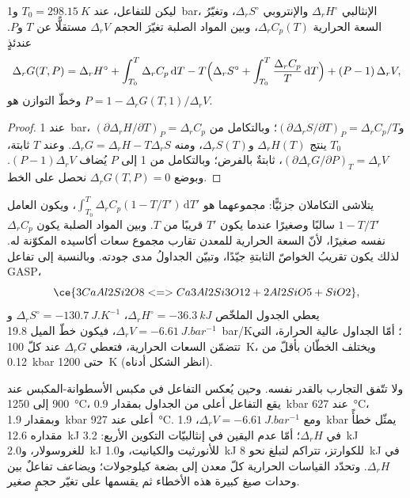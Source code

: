 \begin{theorem}\label{thm:b3:petrological-thermodynamics:dg}
ليكن للتفاعل، عند $T_0 = \qty{298.15}{K}$ و\qty{1}{bar}،
الإنثالبي $\Delta_rH^\circ$ والإنتروبي $\Delta_rS^\circ$، وتغيّرُ السعة الحرارية
$\Delta_rC_p(T)$، وبين المواد الصلبة تغيّرَ الحجم $\Delta_rV$
مستقلًّا عن $T$ و$P$. عندئذٍ
\[
  \Delta_rG(T, P) = \Delta_rH^\circ + \int_{T_0}^{T}\Delta_rC_p\,\mathrm dT
  - T\Bigl(\Delta_rS^\circ + \int_{T_0}^{T}\frac{\Delta_rC_p}{T}\,\mathrm dT\Bigr)
  + (P - 1)\,\Delta_rV ,
\]
وخطّ التوازن هو $P = 1 - \Delta_rG(T, 1)/\Delta_rV$.
\end{theorem}

\begin{proof}
عند \qty{1}{bar}، $(\partial\Delta_rH/\partial T)_P = \Delta_rC_p$
و$(\partial\Delta_rS/\partial T)_P = \Delta_rC_p/T$؛ وبالتكامل من $T_0$
ينتج $\Delta_rH(T)$ و$\Delta_rS(T)$، ومنه $\Delta_rG = \Delta_rH -
T\Delta_rS$. وعند $T$ ثابتة، $(\partial\Delta_rG/\partial P)_T = \Delta_rV$،
ثابتةٌ بالفرض؛ وبالتكامل من 1 إلى $P$ يُضاف $(P - 1)\Delta_rV$.
وبوضع $\Delta_rG(T, P) = 0$ نحصل على الخط.
\end{proof}

يتلاشى التكاملان جزئيًّا: مجموعهما هو $\int_{T_0}^T\Delta_rC_p(1 -
T/T')\,\mathrm dT'$، ويكون العامل $1 - T/T'$ سالبًا وصغيرًا
عندما يكون $T'$ قريبًا من $T$. وبين المواد الصلبة يكون $\Delta_rC_p$ نفسه صغيرًا،
لأنّ السعة الحرارية للمعدن تقارب مجموع سعات أكاسيده
المكوّنة له. لذلك يكون تقريبُ الخواصّ الثابتةِ جيّدًا، وتبيّن الجداولُ
مدى جودته. وبالنسبة إلى تفاعل GASP،
\[
  \ce{3 CaAl2Si2O8 <=> Ca3Al2Si3O12 + 2 Al2SiO5 + SiO2},
\]
يعطي الجدول الملخّص $\Delta_rH^\circ = \qty{-36.3}{kJ}$،
$\Delta_rS^\circ = \qty{-130.7}{J.K^{-1}}$ و$\Delta_rV =
\qty{-6.61}{J.bar^{-1}}$، فيكون خطّ الميل \qty{19.8}{bar/K}؛ أمّا
الجداول عالية الحرارة، التي تتضمّن السعات الحرارية، فتعطي
$\Delta_rG$ عند كلّ \qty{100}{K}، ويختلف الخطّان بأقلّ من
\qty{0.12}{kbar} حتى \qty{1200}{K} (انظر الشكل أدناه).

ولا تتّفق التجارب بالقدر نفسه. وحين يُعكس التفاعل في مكبس الأسطوانة-المكبس عند
900 إلى \qty{1250}{\celsius}، يقع التفاعل أعلى من الجداول بمقدار \qty{0.9}{kbar}
عند \qty{627}{\celsius}، وبمقدار \qty{1.9}{kbar} أعلى عند
\qty{927}{\celsius}. ومع $\Delta_rV = \qty{-6.61}{J.bar^{-1}}$،
\qty{1.9}{kbar} يمثّل خطأً مقداره \qty{12.6}{kJ} في $\Delta_rH$؛ أمّا
عدم اليقين في إنثالبيّات التكوين الأربع: \qty{3.2}{kJ} للغروسولار،
و\qty{2.0}{kJ} للأنورثيت والكيانيت، و\qty{1.0}{kJ} للكوارتز،
تتراكم لتبلغ نحو \qty{8}{kJ} في $\Delta_rH$. وتحدّد القياسات الحرارية كلّ معدن
إلى بضعة كيلوجولات؛ ويضاعف تفاعلٌ بين وحدات صيغ كبيرة
هذه الأخطاء ثم يقسمها على تغيّر حجمٍ صغير.

